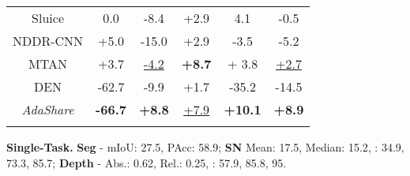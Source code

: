 \begin{table}
{\begin{center}
{\begin{tabular}{c|c|ccc|c}
            Sluice & 0.0 & -8.4 & +2.9 & 4.1 & -0.5\\
            NDDR-CNN & +5.0 & -15.0 & +2.9 & -3.5 & -5.2 \\
            MTAN & +3.7 & \underline{-4.2} & \textbf{+8.7} & + 3.8  & \underline{+2.7}\\
            DEN & -62.7 & -9.9 & +1.7 & -35.2 & -14.5\\
            \hline
            \textit{AdaShare} &\textbf{ -66.7} &\textbf{ +8.8}&  \underline{+7.9} & \textbf{+10.1} & \textbf{+8.9}\\
            \Xhline{3\arrayrulewidth} 
        \end{tabular}}
        \begin{flushleft}
         {\scriptsize \textbf{Single-Task.} \textbf{Seg} - mIoU: 27.5, PAcc: 58.9; \textbf{SN} Mean: 17.5, Median: 15.2, : 34.9, 73.3, 85.7; \textbf{Depth} - Abs.: 0.62, Rel.: 0.25, : 57.9, 85.8, 95.}
         \end{flushleft}
    \end{center}
} \vspace{-5mm}
\end{table}
 










